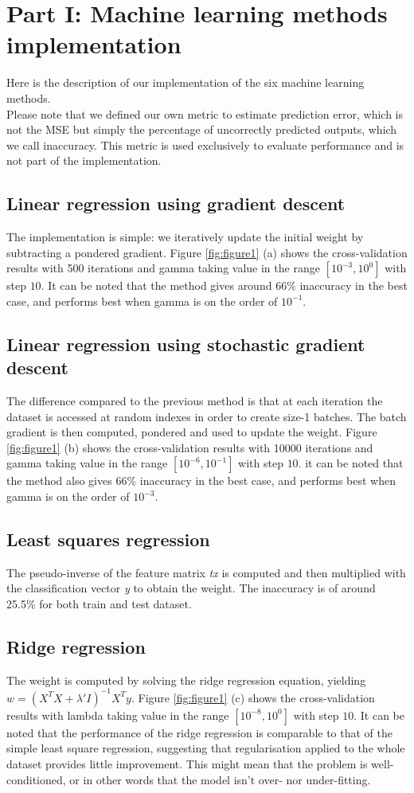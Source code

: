 \documentclass[10pt,conference,compsocconf]{IEEEtran}
\begin{document}
\section{Part I: Machine learning methods implementation}
Here is the description of our implementation of the six machine learning methods.\\
Please note that we defined our own metric to estimate prediction error, which is not the MSE but simply the percentage of uncorrectly predicted outputs, which we call inaccuracy. 
This metric is used exclusively to evaluate performance and is not part of the implementation.
 \subsection{Linear regression using gradient descent}
The implementation is simple: we iteratively update the initial weight by subtracting a pondered gradient.
Figure \ref{fig:figure1} (a) shows the cross-validation results with 500 iterations and gamma taking value in the range $[10^{-3}, 10^{0}]$ with step $10$. It can be noted that the method gives around 66\% inaccuracy in the best case, and performs best when gamma is on the order of $10^{-1}$. 
\subsection{Linear regression using stochastic gradient descent}
The difference compared to the previous method is that at each iteration the dataset is accessed at random indexes in order to
create size-1 batches. The batch gradient is then computed, pondered and used to update the weight. Figure \ref{fig:figure1} (b) shows the cross-validation results with 10000 iterations and gamma taking value in the range $[10^{-6}, 10^{-1}]$ with step $10$. it can be noted that the method also gives 66\% inaccuracy in the best case, and performs best when gamma is on the order of $10^{-3}$. 
\subsection{Least squares regression}
The pseudo-inverse of the feature matrix \textit{tx} is computed and then multiplied with the classification vector \textit{y} to obtain the weight.
The inaccuracy is of around 25.5\% for both train and test dataset.
\subsection{Ridge regression}
The weight is computed by solving the ridge regression equation, yielding $w = (X^{T}X + \lambda'I)^{-1}X^{T}y$.
Figure \ref{fig:figure1} (c) shows the cross-validation results with lambda taking value in the range $[10^{-8}, 10^{0}]$ with step $10$. It can be noted that the performance of the ridge regression is comparable to that of the simple least square regression, suggesting that regularisation applied to the whole dataset provides little improvement. This might mean that the problem is well-conditioned, or in other words that the model isn't over- nor under-fitting.
\end{document}
